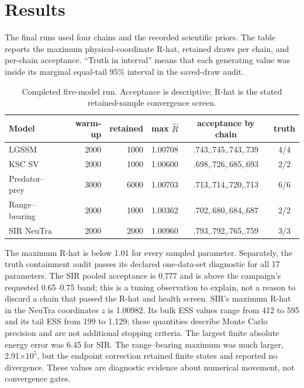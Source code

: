 \section{Results}
\label{sec:bf-surrogate-results}

The final runs used four chains and the recorded scientific priors.  The table
reports the maximum physical-coordinate R-hat, retained draws per chain, and
per-chain acceptance.  ``Truth in interval'' means that each generating value
was inside its marginal equal-tail 95\% interval in the saved-draw audit.
\begin{table}[ht]
\centering\scriptsize
\caption{Completed five-model run.  Acceptance is descriptive; R-hat is the
stated retained-sample convergence screen.}
\label{tab:bf-surrogate-results}
\begin{tabular}{lrrlcc}
\toprule
Model & warm-up & retained & max $\widehat R$ & acceptance by chain & truth\\
\midrule
LGSSM & 2000 & 1000 & 1.00708 & .743,.745,.743,.739 & 4/4\\
KSC SV & 2000 & 1000 & 1.00600 & .698,.726,.685,.693 & 2/2\\
Predator--prey & 3000 & 6000 & 1.00703 & .713,.714,.720,.713 & 6/6\\
Range--bearing & 2000 & 1000 & 1.00362 & .702,.680,.684,.687 & 2/2\\
SIR NeuTra & 2000 & 2000 & 1.00960 & .793,.792,.765,.759 & 3/3\\
\bottomrule
\end{tabular}
\end{table}

The maximum R-hat is below 1.01 for every sampled parameter.  Separately, the truth
containment audit passes its declared one-data-set diagnostic for all
17 parameters.  The SIR pooled acceptance is $0.777$ and is above the
campaign's requested 0.65--0.75 band; this is a tuning observation to explain,
not a reason to discard a chain that passed the R-hat and health screen.
SIR's maximum R-hat in the NeuTra coordinates $z$ is 1.00982.  Its bulk ESS values range from
412 to 595 and its tail ESS from 199 to 1,129; these quantities describe Monte
Carlo precision and are not additional stopping criteria.  The largest finite
absolute energy error was 6.45 for SIR.  The range--bearing maximum was much
larger, 2.91$\times10^5$, but the endpoint correction retained finite states and
reported no divergence.  These values are diagnostic evidence about numerical
movement, not convergence gates.

